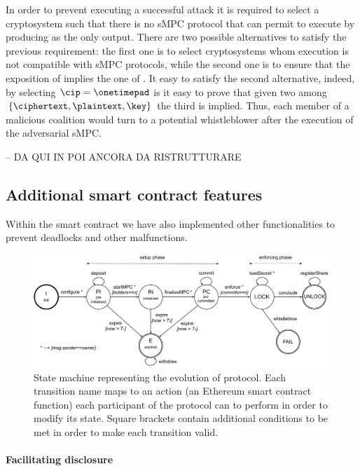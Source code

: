 In order to prevent \coalition executing a successful attack it is required to select a cryptosystem \cipvocabulary such that there is no sMPC protocol that can permit to execute \dec by producing \plaintext as the only output. There are two possible alternatives to satisfy the previous requirement: the first one is to select cryptosystems whom execution is not compatible with sMPC protocols, while the second one is to ensure that the exposition of \plaintext implies the one of \key.
It easy to satisfy the second alternative, indeed, by selecting $\cip = \onetimepad$ is it easy to prove that given two among $\{ \ciphertext , \plaintext , \key \}$ the third is implied. Thus, each member of a malicious coalition would turn to a potential whistleblower after the execution of the adversarial sMPC.

--
\newline
DA QUI IN POI ANCORA DA RISTRUTTURARE

\subsection{Additional smart contract features}

Within the smart contract we have also implemented other functionalities to prevent deadlocks and other malfunctions.

\begin{figure}[t]
	\centering
	\includegraphics[width=\textwidth]{fig/protocol_fsm_simple_version}
	\caption{State machine representing the evolution of \shortname protocol. Each transition name maps to an action (an Ethereum smart contract function) each participant of the protocol can to perform in order to modify its state. Square brackets contain additional conditions to be met in order to make each transition valid.}
	\label{fig:fsm}
\end{figure}
 
\paragraph{Facilitating disclosure}

